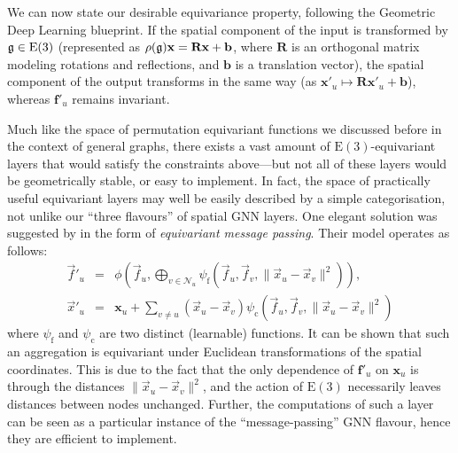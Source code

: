 We can now state our desirable equivariance property, following the Geometric Deep Learning blueprint. If the spatial component of the input is transformed by ${\mathfrak{g}}\in \mathrm{E}(3)$ (represented as $\rho({\mathfrak{g}})\mathbf{x} = \mathbf{R}\mathbf{x} + \mathbf{b}$, where $\mathbf{R}$ is an orthogonal matrix modeling rotations and reflections, and $\mathbf{b}$ is a translation vector), the spatial component of the output transforms in the same way (as $\mathbf{x}'_u \mapsto \mathbf{R}\mathbf{x}'_u + \mathbf{b}$), whereas $\mathbf{f}'_u$ remains invariant.

Much like the space of permutation equivariant functions we discussed before in the context of general graphs, there exists a vast amount of $\mathrm{E}(3)$-equivariant layers that would satisfy the constraints above---but not all of these layers would be geometrically stable, or easy to implement. In fact, the space of practically useful equivariant layers may well be easily described by a simple categorisation, not unlike our ``three flavours'' of spatial GNN layers.
%
One elegant solution was suggested by \cite{satorras2021n} in the form of {\em equivariant message passing}. Their model operates as follows:  
%
\begin{eqnarray*}
    \vec{f}'_u &=& \phi\left(\vec{f}_u, \bigoplus\limits_{v\in\mathcal{N}_u}\psi_\mathrm{f}(\vec{f}_u, \vec{f}_v, \| \vec{x}_u - \vec{x}_v \|^2)\right), \\
    \vec{x}'_u &=& \mathbf{x}_u + \sum_{v\neq u} (\vec{x}_u - \vec{x}_v) \psi_\mathrm{c}(\vec{f}_u, \vec{f}_v, \| \vec{x}_u - \vec{x}_v \|^2)
\end{eqnarray*}
%
where $\psi_\mathrm{f}$ and $\psi_\mathrm{c}$ are two distinct (learnable) functions. It can be shown that such an aggregation is equivariant under Euclidean transformations of the spatial coordinates. This is due to the fact that the only dependence of $\mathbf{f}'_u$ on $\mathbf{x}_u$ is through the distances $\| \vec{x}_u - \vec{x}_v \|^2$, and the action of $\mathrm{E}(3)$ necessarily leaves distances between nodes unchanged. Further, the computations of such a layer can be seen as a particular instance of the ``message-passing'' GNN flavour, hence they are efficient to implement.

